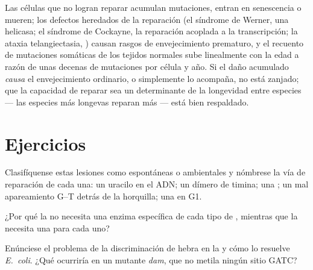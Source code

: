 \begin{remark}\label{rem:b3:dna-repair:ageing}
Las células que no logran reparar acumulan mutaciones, entran en
senescencia o mueren; los defectos heredados de la reparación (el
síndrome de Werner, una helicasa; el síndrome de Cockayne, la reparación
acoplada a la transcripción; la ataxia telangiectasia, ) causan rasgos
de envejecimiento prematuro, y el recuento de mutaciones somáticas de los
tejidos normales sube linealmente con la edad a razón de unas decenas de
mutaciones por célula y año. Si el daño acumulado \emph{causa} el
envejecimiento ordinario, o simplemente lo acompaña, no está zanjado; que
la capacidad de reparar sea un determinante de la longevidad entre
especies --- las especies más longevas reparan más --- está bien
respaldado.
\end{remark}

\section{Ejercicios}

\begin{exercise}[$\star$]\label{exo:b3:dna-repair:1}
Clasifíquense estas lesiones como espontáneas o ambientales y nómbrese la
vía de reparación de cada una: un uracilo en el ADN; un dímero de timina;
una ; un mal apareamiento G--T detrás de la horquilla; una
 en G1.
\end{exercise}

\begin{exercise}[$\star$]\label{exo:b3:dna-repair:2}
¿Por qué la  no necesita una enzima
específica de cada tipo de , mientras que la  necesita una  para cada uno?
\end{exercise}

\begin{exercise}[$\star$]\label{exo:b3:dna-repair:3}
Enúnciese el problema de la discriminación de hebra en la  y cómo lo resuelve \emph{E.~coli}. ¿Qué ocurriría
en un mutante \emph{dam}, que no metila ningún sitio GATC?
\end{exercise}


